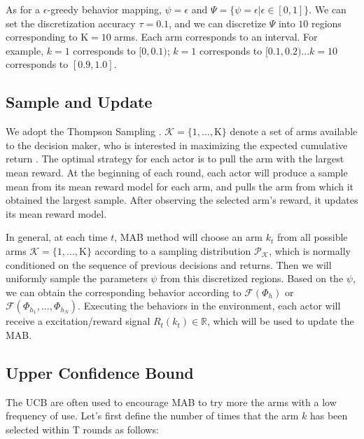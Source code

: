 \begin{Example}
    As for a $\epsilon$-greedy behavior mapping, $\psi=\epsilon$ and $\Psi = \{\psi=\epsilon|\epsilon\in[0,1]\}$. We can set the discretization accuracy $\tau=0.1$, and we can discretize $\Psi$ into $10$ regions corresponding to $\mathrm{K}=10$ arms. Each arm corresponds to an interval. For example, $k=1$ corresponds to $[0,0.1)$; $k=1$ corresponds to $[0.1,0.2)$...$k=10$ corresponds to $[0.9,1.0]$.
\end{Example}





\subsection{Sample and Update} 

We adopt the Thompson Sampling \citep{garivier2008upper}. $\mathcal{K}=\{1,...,\mathrm{K}\}$ denote a set of arms available to the decision maker, who is interested in maximizing the expected cumulative return \citep{agent57,DvD}. The optimal strategy for each actor is to pull the arm with the largest mean reward. At the beginning of each round, each actor will produce a sample mean from its mean reward model for each arm, and pulls the arm from which it obtained the largest sample. After observing the selected arm's reward, it updates its mean reward model.


In general, at each time $t$, MAB method will choose an arm $k_t$ from all possible arms $\mathcal{K} = \{1,...,\mathrm{K}\}$ according to a sampling distribution $\mathcal{P}_{\mathcal{K}}$, which is normally conditioned on the sequence of previous decisions and returns. Then we will uniformly sample the parameters $\psi$ from this discretized regions.  Based on the $\psi$, we can obtain the corresponding behavior according to $\mathcal{F}(\Phi_{h})$ or $\mathcal{F}(\Phi_{h_1},...,\Phi_{h_N})$. Executing the behaviors in the environment, each actor will receive a excitation/reward signal  $R_t(k_t)\in \mathbb{R}$, which will be used to update the MAB.




\subsection{Upper Confidence Bound}

The UCB \citep{garivier2008upper} are often used to encourage MAB to try more the arms with a low frequency of use. Let's first define the number of times that the arm $k$ has been selected within T rounds as follows:

